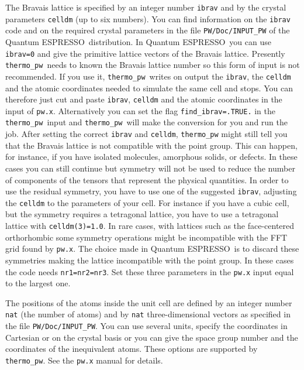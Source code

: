 \documentclass[12pt,a4paper]{article}
\def\qe{{\sc Quantum ESPRESSO}}
\def\thermo{\texttt{thermo\_pw}}
\begin{document}
The Bravais lattice is specified by an integer number \texttt{ibrav} and by the
crystal parameters \texttt{celldm} (up to six numbers). You can find 
information on the \texttt{ibrav} code and on the required crystal parameters
in the file \texttt{PW/Doc/INPUT\_PW} of the \qe\ distribution. 
In \qe\ you can use \texttt{ibrav=0} and give the primitive
lattice vectors of the Bravais lattice. Presently \thermo\ needs to
known the Bravais lattice number so this form of input is not recommended. 
If you use it, \thermo\ writes on output the \texttt{ibrav}, the 
\texttt{celldm} and the atomic coordinates needed to simulate
the same cell and stops.
You can therefore just cut and paste \texttt{ibrav}, \texttt{celldm} 
and the atomic coordinates in the input of \texttt{pw.x}. Alternatively
you can set the flag \texttt{find\_ibrav=.TRUE.} in the \thermo\ input
and \thermo\ will make the conversion for you and run the job. 
After setting the correct
\texttt{ibrav} and \texttt{celldm}, \texttt{thermo\_pw} might still tell you
that the Bravais lattice is not compatible with the point group. This
can happen, for instance, if you have isolated molecules, amorphous solids,
or defects. In these cases you can still continue but symmetry will not be 
used to reduce the number of components of the tensors that represent 
the physical quantities. In order to use the residual symmetry, you have to
use one of the suggested \texttt{ibrav}, adjusting the \texttt{celldm} to
the parameters of your cell. For instance if you have a cubic cell, but
the symmetry requires a tetragonal lattice, you have to use a tetragonal
lattice with \texttt{celldm(3)=1.0}.
In rare cases, with lattices such as the face-centered orthorhombic some
symmetry operations might be incompatible with the FFT grid found by 
\texttt{pw.x}. The choice made in \qe\ is to discard these symmetries making
the lattice incompatible with the point group. In these cases the code needs 
\texttt{nr1=nr2=nr3}. Set these three parameters in the \texttt{pw.x} input 
equal to the largest one. 

The positions of the atoms inside the unit cell are defined by an integer
number \texttt{nat} (the number of atoms) and by \texttt{nat} 
three-dimensional vectors as specified in the file \texttt{PW/Doc/INPUT\_PW}.
You can use several units, specify the coordinates in Cartesian or on the
crystal basis or you can give the space group number and the
coordinates of the inequivalent atoms. 
These options are supported by \thermo. See the \texttt{pw.x} manual
for details. \\
\end{document}
